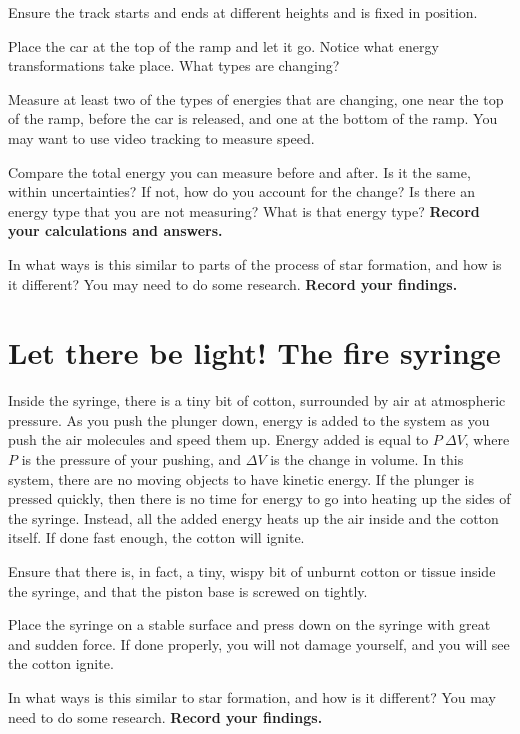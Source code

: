 \begin{steps}
	\item Ensure the track starts and ends at different heights and is fixed in position.
	
	\item Place the car at the top of the ramp and let it go. Notice what energy transformations take place. What types are changing?
	
	\item Measure at least two of the types of energies that are changing, one near the top of the ramp, before the car is released, and one at the bottom of the ramp. You may want to use video tracking to measure speed.
	
	\item Compare the total energy you can measure before and after. Is it the same, within uncertainties? If not, how do you account for the change? Is there an energy type that you are not measuring? What is that energy type? \textbf{Record your calculations and answers.}
	
	\item In what ways is this similar to parts of the process of star formation, and how is it different? You may need to do some research. \textbf{Record your findings.}
\end{steps}

\section{Let there be light! The fire syringe}

Inside the syringe, there is a tiny bit of cotton, surrounded by air at atmospheric pressure. As you push the plunger down, energy is added to the system as you push the air molecules and speed them up. Energy added is equal to $P \:\Delta V$, where $P$ is the pressure of your pushing, and $\Delta V$ is the change in volume. In this system, there are no moving objects to have kinetic energy. If the plunger is pressed quickly, then there is no time for energy to go into heating up the sides of the syringe. Instead, all the added energy heats up the air inside and the cotton itself. If done fast enough, the cotton will ignite.

\begin{steps}
	\item Ensure that there is, in fact, a tiny, wispy bit of unburnt cotton or tissue inside the syringe, and that the piston base is screwed on tightly.
	
	\item Place the syringe on a stable surface and press down on the syringe with great and sudden force. If done properly, you will not damage yourself, and you will see the cotton ignite.

	\item In what ways is this similar to star formation, and how is it different? You may need to do some research. \textbf{Record your findings.}
\end{steps}

